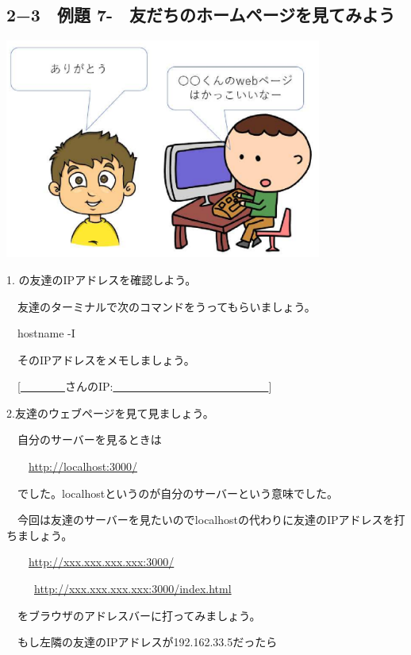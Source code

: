 \documentclass[a4paper,12pt,dvipdfmx]{jarticle}
\newcounter{Exercise}
\renewcommand\theExercise{例題 7-\arabic{Exercise}}
\begin{document}
\bigskip


\bigskip


\bigskip

\clearpage\subsection*{2−3　\theExercise　友だちのホームページを見てみよう}


\centering
\includegraphics[width=10.423cm]{ome7-img042}
\flushleft


\bigskip



1.
の友達のIPアドレスを確認しよう。

\ \ 友達のターミナルで次のコマンドをうってもらいましょう。

\ \ hostname -I

\ \ そのIPアドレスをメモしましょう。

\ \ [\underline{　　　　}さんのIP:\underline{　　　　　　　　　　　　　　}]


\bigskip

2.友達のウェブページを見て見ましょう。

\ \ 自分のサーバーを見るときは

\ \ 　\url{http://localhost:3000/}

\ \ でした。localhostというのが自分のサーバーという意味でした。

\ \ 今回は友達のサーバーを見たいのでlocalhostの代わりに友達のIPアドレスを打ちましょう。

\ \ 　\url{http://xxx.xxx.xxx.xxx:3000/}

\ \ \ 　\url{http://xxx.xxx.xxx.xxx:3000/index.html}

\ \ をブラウザのアドレスバーに打ってみましょう。

\ \ もし左隣の友達のIPアドレスが192.162.33.5だったら
\end{document}
